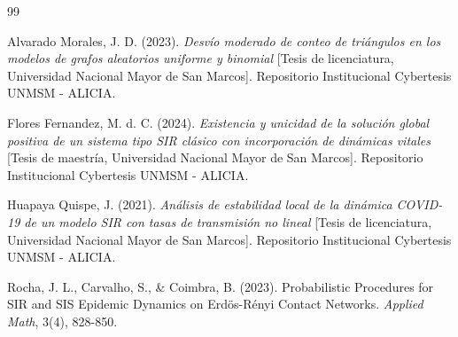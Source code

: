 \documentclass[12pt]{article}
\begin{document}
\begin{thebibliography}{99}

Alvarado Morales, J. D. (2023). \textit{Desvío moderado de conteo de triángulos en los modelos de grafos aleatorios uniforme y binomial} [Tesis de licenciatura, Universidad Nacional Mayor de San Marcos]. Repositorio Institucional Cybertesis UNMSM - ALICIA.

Flores Fernandez, M. d. C. (2024). \textit{Existencia y unicidad de la solución global positiva de un sistema tipo SIR clásico con incorporación de dinámicas vitales} [Tesis de maestría, Universidad Nacional Mayor de San Marcos]. Repositorio Institucional Cybertesis UNMSM - ALICIA.

Huapaya Quispe, J. (2021). \textit{Análisis de estabilidad local de la dinámica COVID-19 de un modelo SIR con tasas de transmisión no lineal} [Tesis de licenciatura, Universidad Nacional Mayor de San Marcos]. Repositorio Institucional Cybertesis UNMSM - ALICIA.

Rocha, J. L., Carvalho, S., \& Coimbra, B. (2023). Probabilistic Procedures for SIR and SIS Epidemic Dynamics on Erdös-Rényi Contact Networks. \textit{Applied Math}, 3(4), 828-850.

\end{thebibliography}
\end{document}
